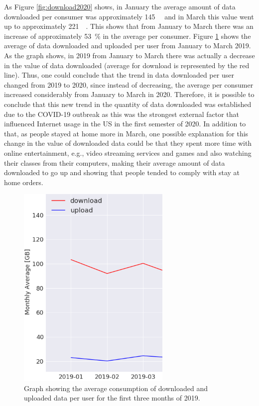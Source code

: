 \documentclass[conference,10pt]{IEEEtran}
\begin{document}
As Figure \ref{fig:download2020} shows, in January the average amount of data downloaded per consumer was approximately \SI{145}{\giga\byte} and in March this value went up to approximately \SI{221}{\giga\byte}. This shows that from January to March there was an increase of approximately \SI{53}{\percent} in the average per consumer. Figure \ref{fig:downloadup2019} shows the average of data downloaded and uploaded per user from January to March 2019. As the graph shows, in 2019 from January to March there was actually a decrease in the value of data downloaded (average for download is represented by the red line). Thus, one could conclude that the trend in data downloaded per user changed from 2019 to 2020, since instead of decreasing, the average per consumer increased considerably from January to March in 2020. Therefore, it is possible to conclude that this new trend in the quantity of data downloaded was established due to the COVID-19 outbreak as this was the strongest external factor that influenced Internet usage in the US in the first semester of 2020. In addition to that, as people stayed at home more in March, one possible explanation for this change in the value of downloaded data could be that they spent more time with online entertainment, e.g., video streaming services and games and also watching their classes from their computers, making their average amount of data downloaded to go up and showing that people tended to comply with stay at home orders.

\begin{figure}
\centering
\includegraphics[width=0.5\linewidth]{figs/downloadup2019.PNG}
\caption{Graph showing the average consumption of downloaded and uploaded data per user for the first three months of 2019.}
\label{fig:downloadup2019}
\end{figure}
\end{document}
